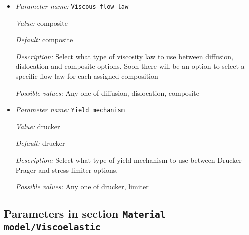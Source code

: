 \begin{itemize}
{\it Value:} harmonic


{\it Default:} harmonic


{\it Description:} When more than one compositional field is present at a point with different viscosities, we need to come up with an average viscosity at that point.  Select a weighted harmonic, arithmetic, geometric, or maximum composition.


{\it Possible values:} Any one of arithmetic, harmonic, geometric, maximum composition
\item {\it Parameter name:} {\tt Viscous flow law}
\label{parameters:Material model/Visco Plastic/Viscous flow law}


{\it Value:} composite


{\it Default:} composite


{\it Description:} Select what type of viscosity law to use between diffusion, dislocation and composite options. Soon there will be an option to select a specific flow law for each assigned composition 


{\it Possible values:} Any one of diffusion, dislocation, composite
\item {\it Parameter name:} {\tt Yield mechanism}
\label{parameters:Material model/Visco Plastic/Yield mechanism}


{\it Value:} drucker


{\it Default:} drucker


{\it Description:} Select what type of yield mechanism to use between Drucker Prager and stress limiter options.


{\it Possible values:} Any one of drucker, limiter
\end{itemize}

\subsection{Parameters in section \tt Material model/Viscoelastic}
\label{parameters:Material_20model/Viscoelastic}

